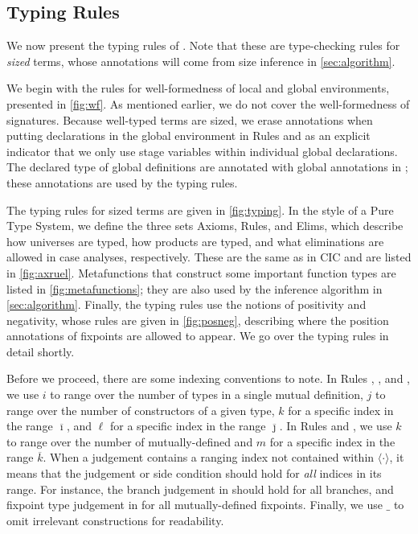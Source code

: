 \documentclass[acmsmall,screen,review,10pt]{acmart} %
\begin{document}
\subsection{Typing Rules}

We now present the typing rules of \lang. Note that these are type-checking rules for \textit{sized} terms, whose annotations will come from size inference in \autoref{sec:algorithm}.



We begin with the rules for well-formedness of local and global environments, presented in \autoref{fig:wf}. As mentioned earlier, we do not cover the well-formedness of signatures. Because well-typed terms are sized, we erase annotations when putting declarations in the global environment in Rules  and  as an explicit indicator that we only use stage variables within individual global declarations. The declared type of global definitions are annotated with global annotations in ; these annotations are used by the typing rules.







The typing rules for sized terms are given in \autoref{fig:typing}. In the style of a Pure Type System, we define the three sets Axioms, Rules, and Elims, which describe how universes are typed, how products are typed, and what eliminations are allowed in case analyses, respectively. These are the same as in CIC and are listed in \autoref{fig:axruel}. Metafunctions that construct some important function types are listed in \autoref{fig:metafunctions}; they are also used by the inference algorithm in \autoref{sec:algorithm}. Finally, the typing rules use the notions of positivity and negativity, whose rules are given in \autoref{fig:posneg}, describing where the position annotations of fixpoints are allowed to appear. We go over the typing rules in detail shortly.



Before we proceed, there are some indexing conventions to note. In Rules , , and , we use $i$ to range over the number of \coinductive types in a single mutual \coinductive definition, $j$ to range over the number of constructors of a given \coinductive type, $k$ for a specific index in the range $\overline{\imath}$, and $\ell$ for a specific index in the range $\overline{\jmath}$. In Rules  and , we use $k$ to range over the number of mutually-defined \cofixpoints and $m$ for a specific index in the range $\overline{k}$. When a judgement contains a ranging index not contained within $\langle \cdot \rangle$, it means that the judgement or side condition should hold for \textit{all} indices in its range. For instance, the branch judgement in  should hold for all branches, and fixpoint type judgement in  for all mutually-defined fixpoints. Finally, we use $\_$ to omit irrelevant constructions for readability.
\end{document}

